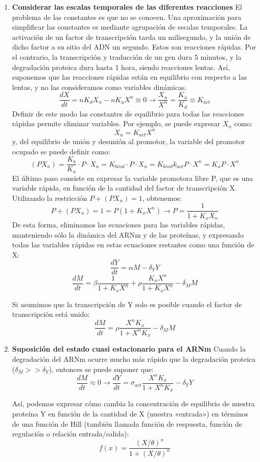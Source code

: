 \begin{enumerate}
\item \textbf{Considerar las escalas temporales de las diferentes reacciones}
El problema de las constantes es que no se conocen. Una aproximación para simplificar las constantes es mediante agrupación de escalas temporales. La activación de un factor de transcripción tarda un milisegundo, y la unión de dicho factor a su sitio del ADN un segundo. Estos son reacciones rápidas. Por el contrario, la transcripción y traducción de un gen dura 5 minutos, y la degradación proteica dura hasta 1 hora, siendo reacciones lentas. Así, suponemos que las reacciones rápidas están en equilibrio con respecto a las lentas, y no las consideramos como variables dinámicas.
$$\frac{dX}{dt} = nK_dX_n - nK_aX^n \cong 0 \rightarrow \frac{X_n}{X^n} = \frac{K_a}{K_d} \equiv K_{act}$$
Definir de este modo las constantes de equilibrio para todas las reacciones rápidas permite eliminar variables. Por ejemplo, se puede expresar $X_n$ como:
$$X_n = K_{act} X^n$$
y, del equilibrio de unión y desunión al promotor, la variable del promotor ocupado se puede definir como:
$$(PX_n) =  \frac{K_b}{K_u} \cdot P \cdot X_n = K_{bind} \cdot P \cdot X_n = K_{bind} k_{act} P \cdot X^n = K_x P \cdot X^n$$
El último paso consiste en expresar la variable promotora libre P, que es una variable rápida, en función de la cantidad del factor de transcripción X. Utilizando la restricción $P + (PX_n) = 1$, obtenemos:
$$P + (PX_n) = 1 = P(1 + K_xX^n) \rightarrow P = \frac{1}{1 + K_xX_n}$$
De esta forma, eliminamos las ecuaciones para las variables rápidas, manteniendo sólo la dinámica del ARNm y de las proteínas, y expresando todas las variables rápidas en estas ecuaciones restantes como una función de X:
$$\frac{dY}{dt} = \alpha M - \delta_Y Y$$
$$\frac{dM}{dt} = \beta \frac{1}{1 + K_xX^n} + \rho \frac{K_xX^n}{1 + K_x X^n} - \delta_M M$$

Si asumimos que la transcripción de Y solo es posible cuando el factor de transcripción está unido:
$$\frac{dM}{dt} = \rho \frac{X^n K_x}{1 + X^nK_x} - \delta_M M$$

\item \textbf{Suposición del estado cuasi estacionario para el ARNm}
Cuando la degradación del ARNm ocurre mucho más rápido que la degradación proteica ($\delta_M >> \delta_Y$), entonces se puede suponer que: 
$$\frac{dM}{dt} \approx 0 \rightarrow \frac{dY}{dt} = \sigma_{act} \frac{X^n K_x}{1 + X^n K_x} - \delta_Y Y$$

Así, podemos expresar cómo cambia la concentración de equilibrio de nuestra proteína Y en función de la cantidad de X (nuestra «entrada») en términos de una función de Hill (también llamada función de respuesta, función de regulación o relación entrada/salida):
$$f(x) = \frac{(X/\theta)^n}{1 + (X/\theta)^n}$$


\end{enumerate}
